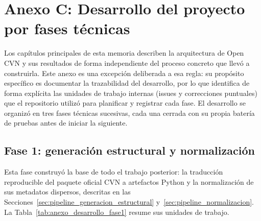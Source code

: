 \chapter*{Anexo C: Desarrollo del proyecto por fases técnicas}
\label{cap:anexo_desarrollo}

\setcounter{section}{0}
\renewcommand{\thesection}{C.\arabic{section}}
\setcounter{table}{0}
\renewcommand{\thetable}{C.\arabic{table}}

Los capítulos principales de esta memoria describen la arquitectura de Open
CVN y sus resultados de forma independiente del proceso concreto que llevó a
construirla. Este anexo es una excepción deliberada a esa regla: su
propósito específico es documentar la trazabilidad del desarrollo, por lo
que identifica de forma explícita las unidades de trabajo internas (issues y
correcciones puntuales) que el repositorio utilizó para planificar y
registrar cada fase. El desarrollo se organizó en tres fases técnicas
sucesivas, cada una cerrada con su propia batería de pruebas antes de
iniciar la siguiente.

\section{Fase 1: generación estructural y normalización}
\label{sec:anexo_desarrollo_fase1}

Esta fase construyó la base de todo el trabajo posterior: la traducción
reproducible del paquete oficial CVN a artefactos Python y la normalización
de sus metadatos dispersos, descritas en las
Secciones~\ref{sec:pipeline_generacion_estructural}
y~\ref{sec:pipeline_normalizacion}. La Tabla~\ref{tab:anexo_desarrollo_fase1}
resume sus unidades de trabajo.

